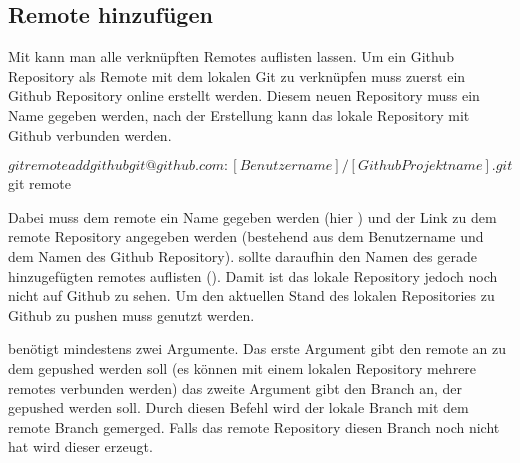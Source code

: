 \subsection{Remote hinzufügen}
Mit  kann man alle verknüpften Remotes auflisten lassen. Um ein Github Repository als Remote mit dem lokalen Git zu verknüpfen muss zuerst ein Github Repository online erstellt werden. Diesem neuen Repository muss ein Name gegeben werden, nach der Erstellung kann das lokale Repository mit Github verbunden werden.
\begin{mplisting}
$ git remote add github git@github.com:[Benutzername]/[Github Projektname].git
$ git remote
\end{mplisting} 
Dabei muss dem remote ein Name gegeben werden (hier ) und der Link zu dem remote Repository angegeben werden (bestehend aus dem Benutzername und dem Namen des Github Repository).  sollte daraufhin den Namen des gerade hinzugefügten remotes auflisten (). Damit ist das lokale Repository jedoch noch nicht auf Github zu sehen. Um den aktuellen Stand des lokalen Repositories zu Github zu pushen muss  genutzt werden.
 benötigt mindestens zwei Argumente. Das erste Argument gibt den remote an zu dem gepushed werden soll (es können mit einem lokalen Repository mehrere remotes verbunden werden) das zweite Argument gibt den Branch an, der gepushed werden soll. Durch diesen Befehl wird der lokale Branch mit dem remote Branch gemerged. Falls das remote Repository diesen Branch noch nicht hat wird dieser erzeugt.